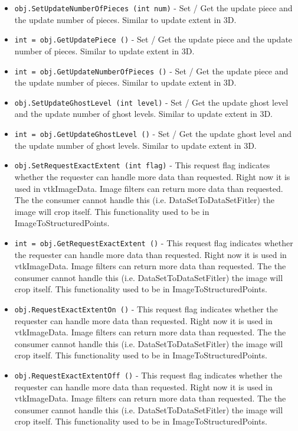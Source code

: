 \begin{itemize}
\item  \verb|obj.SetUpdateNumberOfPieces (int num)| -  Set / Get the update piece and the update number of pieces. Similar
 to update extent in 3D.

\item  \verb|int = obj.GetUpdatePiece ()| -  Set / Get the update piece and the update number of pieces. Similar
 to update extent in 3D.

\item  \verb|int = obj.GetUpdateNumberOfPieces ()| -  Set / Get the update piece and the update number of pieces. Similar
 to update extent in 3D.

\item  \verb|obj.SetUpdateGhostLevel (int level)| -  Set / Get the update ghost level and the update number of ghost levels.
 Similar to update extent in 3D.

\item  \verb|int = obj.GetUpdateGhostLevel ()| -  Set / Get the update ghost level and the update number of ghost levels.
 Similar to update extent in 3D.

\item  \verb|obj.SetRequestExactExtent (int flag)| -  This request flag indicates whether the requester can handle 
 more data than requested.  Right now it is used in vtkImageData.
 Image filters can return more data than requested.  The the 
 consumer cannot handle this (i.e. DataSetToDataSetFitler)
 the image will crop itself.  This functionality used to be in 
 ImageToStructuredPoints.

\item  \verb|int = obj.GetRequestExactExtent ()| -  This request flag indicates whether the requester can handle 
 more data than requested.  Right now it is used in vtkImageData.
 Image filters can return more data than requested.  The the 
 consumer cannot handle this (i.e. DataSetToDataSetFitler)
 the image will crop itself.  This functionality used to be in 
 ImageToStructuredPoints.

\item  \verb|obj.RequestExactExtentOn ()| -  This request flag indicates whether the requester can handle 
 more data than requested.  Right now it is used in vtkImageData.
 Image filters can return more data than requested.  The the 
 consumer cannot handle this (i.e. DataSetToDataSetFitler)
 the image will crop itself.  This functionality used to be in 
 ImageToStructuredPoints.

\item  \verb|obj.RequestExactExtentOff ()| -  This request flag indicates whether the requester can handle 
 more data than requested.  Right now it is used in vtkImageData.
 Image filters can return more data than requested.  The the 
 consumer cannot handle this (i.e. DataSetToDataSetFitler)
 the image will crop itself.  This functionality used to be in 
 ImageToStructuredPoints.


\end{itemize}
